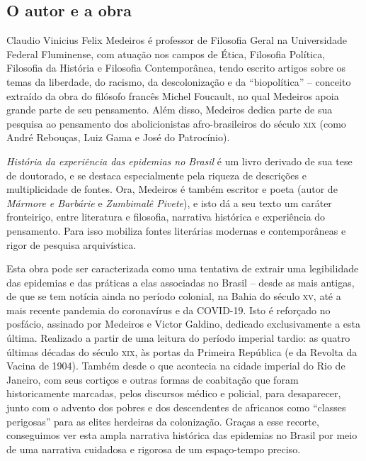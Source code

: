 \documentclass[12pt]{extarticle}
\begin{document}
\subsection{O autor e a obra}


Claudio Vinicius Felix Medeiros é professor de Filosofia Geral na
Universidade Federal Fluminense, com atuação nos campos de Ética,
Filosofia Política, Filosofia da História e Filosofia Contemporânea,
tendo escrito artigos sobre os temas da liberdade, do racismo, da
descolonização e da ``biopolítica'' -- conceito extraído da obra do
filósofo francês Michel Foucault, no qual Medeiros apoia grande parte de
seu pensamento. Além disso, Medeiros dedica parte de sua pesquisa ao
pensamento dos abolicionistas afro-brasileiros do século \textsc{xix} (como André
Rebouças, Luiz Gama e José do Patrocínio).

\emph{História da experiência das epidemias no Brasil} é um livro
derivado de sua tese de doutorado, e se destaca especialmente pela
riqueza de descrições e multiplicidade de fontes. Ora, Medeiros é também
escritor e poeta (autor de \emph{Mármore e Barbárie} e \emph{Zumbimalê
Pivete}), e isto dá a seu texto um caráter fronteiriço, entre literatura
e filosofia, narrativa histórica e experiência do pensamento. Para isso
mobiliza fontes literárias modernas e contemporâneas e rigor de pesquisa
arquivística.

Esta obra pode ser caracterizada como uma tentativa de extrair uma
legibilidade das epidemias e das práticas a elas associadas no Brasil --
desde as mais antigas, de que se tem notícia ainda no período colonial,
na Bahia do século \textsc{xv}, até a mais recente pandemia do coronavírus e da
COVID-19. Isto é reforçado no posfácio, assinado por Medeiros e Victor
Galdino, dedicado exclusivamente a esta última. Realizado a partir de
uma leitura do período imperial tardio: as quatro últimas décadas do
século \textsc{xix}, às portas da Primeira República (e da Revolta da Vacina de
1904). Também desde o que acontecia na cidade imperial do Rio de
Janeiro, com seus cortiços e outras formas de coabitação que foram
historicamente marcadas, pelos discursos médico e policial, para
desaparecer, junto com o advento dos pobres e dos descendentes de
africanos como ``classes perigosas'' para as elites herdeiras da
colonização. Graças a esse recorte, conseguimos ver esta ampla narrativa
histórica das epidemias no Brasil por meio de uma narrativa cuidadosa e
rigorosa de um espaço-tempo preciso.
\end{document}
